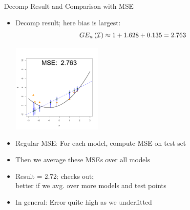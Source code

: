 \documentclass[11pt,compress,t,notes=noshow, xcolor=table]{beamer}
\begin{document}
\begin{vbframe} {Decomp Result and Comparison with MSE}

\begin{footnotesize}
\begin{itemize}
\item Decomp result; here bias is largest:
$$GE_n\left(\mathcal{I}\right) \approx 1 + 1.628 + 0.135 = 2.763 $$
\begin{center}
  \includegraphics[width = 0.35\textwidth]{figure/bias_variance_decomposition-linear_model_mse.png}
\end{center}
\item Regular MSE: For each model, compute MSE on test set
\item Then we average these MSEs over all models
\item Result = 2.72; checks out; \\
better if we avg. over more models and test points 
\item In general: Error quite high as we underfitted
\end{itemize}

\end{footnotesize}

\end{vbframe}
\end{document}
